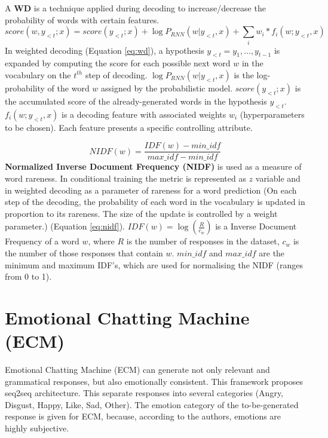 A \textbf{WD} is a technique applied during decoding to increase/decrease the probability of words with certain features. 
\begin{equation} \label{eq:wd}
score(w, y_{<t}; x) = score(y_{<t}; x) + \log P_{RNN}(w|y_{<t}, x) + \sum_i w_i * f_i(w; y_{<t}, x)
\end{equation}
In weighted decoding (Equation \ref{eq:wd}), a hypothesis $y_{<t} = y_1, ..., y_{t-1}$ is expanded by computing the score for each possible next word $w$ in the vocabulary on the $t^{th}$ step of decoding. $\log P_{RNN}(w|y_{<t}, x)$ is the log-probability of the word $w$ assigned by the probabilistic model. $score(y_{<t}; x)$ is the accumulated score of the already-generated words in the hypothesis $y_{<t}$. $f_i(w; y_{<t}, x)$ is a decoding feature with associated weights $w_i$ (hyperparameters to be chosen). Each feature presents a specific controlling attribute.

\begin{equation} \label{eq:nidf}
NIDF(w) = \frac{IDF(w) - min\_idf}{max\_idf - min\_idf}
\end{equation}
\textbf{Normalized Inverse Document Frequency (NIDF)} is used as a measure of word rareness. In conditional training the metric is represented as $z$ variable and in weighted decoding as a parameter of rareness for a word prediction (On each step of the decoding, the probability of each word in the vocabulary is updated in proportion to its rareness. The size of the update is controlled by a weight parameter.) (Equation \ref{eq:nidf}). $IDF(w) = \log(\frac{R}{c_w})$ is a Inverse Document Frequency of a word $w$, where $R$ is the number of responses in the dataset, $c_w$ is the number of those responses that contain $w$. $min\_idf$ and $max\_idf$ are the minimum and maximum IDF's, which are used for normalising the NIDF (ranges from 0 to 1).

\section{Emotional Chatting Machine (ECM)}
Emotional Chatting Machine (ECM) \cite{zhou2018emotional} can generate not only relevant and grammatical responses, but also emotionally consistent. This framework proposes seq2seq architecture. This separate responses into several categories (Angry, Disgust, Happy, Like, Sad, Other). The emotion category of the to-be-generated response is given for ECM, because, according to the authors, emotions are highly subjective. 

